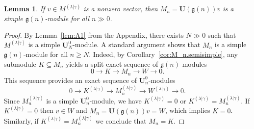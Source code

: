 \documentclass[12pt]{amsart}
\newcommand\g{\mathfrak{g}}
\newcommand\bU{\mathbf{U}}
\theoremstyle{plain}
\newtheorem{lem}[theo]{Lemma}
\theoremstyle{definition}
\numberwithin{equation}{section}
\begin{document}
\begin{lem}\label{lem:M_n.simple}
If $v\in M^{(\lambda | \gamma)}$ is a nonzero vector, then $M_n = \bU(\g(n)) v$ is a simple $\g(n)$-module for all $n\gg 0$.
\end{lem}
\begin{proof}
By Lemma~\ref{lem:A1} from the Appendix, there exists $N\gg 0$ such that $M^{(\lambda | \gamma)}$ is a simple $\bU^0_N$-module. A standard argument shows that $M_n$ is a simple $\g(n)$-module for all $n\geq N$. Indeed, by Corollary~\ref{cor:M_n.semisimple}, any submodule $K\subseteq M_n$ yields a split exact sequence of $\g(n)$-modules
	\[
0\to K\to M_n\to W\to 0.
	\]
This sequence provides an exact sequence of $\bU_n^0$-modules
	\[
0\to K^{(\lambda | \gamma)}\to M_n^{(\lambda | \gamma)}\to W^{(\lambda | \gamma)}\to 0.
	\]
Since $M_n^{(\lambda | \gamma)}$ is a simple $\bU_n^0$-module, we have $K^{(\lambda | \gamma)} = 0$ or $K^{(\lambda | \gamma)} = M_n^{(\lambda | \gamma)}$. If $K^{(\lambda | \gamma)} = 0$ then $v\in W$
 and $M_n = \bU(\g(n))v = W$, which implies $K=0$. Similarly, if $K^{(\lambda | \gamma)} = M_n^{(\lambda | \gamma)}$ we conclude that $M_n = K$.
\end{proof}
\end{document}
